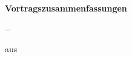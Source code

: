 
\begin{titlepage}
   \begin{center}
       \vspace*{1cm}

       \Huge
       \textbf{Vortragszusammenfassungen}
            
       \vspace{1.5cm}
       \LARGE
       \textbf{\myname{} -- \mynumber{}}
       \vspace{0.01cm}
       \large
       
       {aus \myhome}
       
       \vspace{0.1cm}
       \LARGE
       \mymajor

       \vfill

       \vspace{0.8cm}

       \mydate
            
   \end{center}
\end{titlepage}
